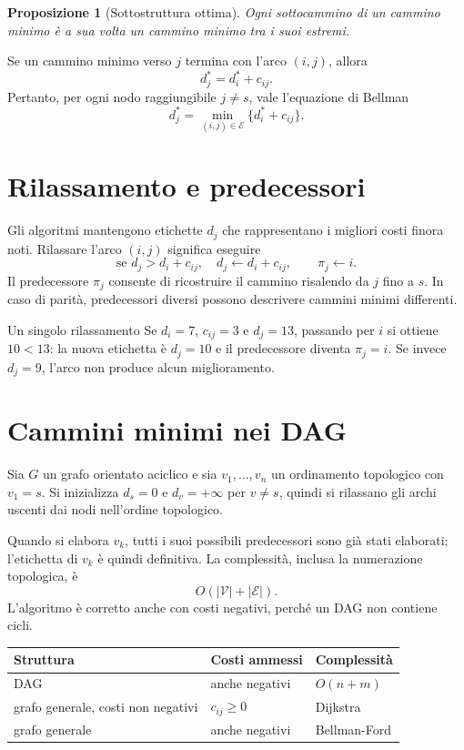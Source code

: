 \documentclass[11pt,a4paper]{article}
\newtheorem{proposition}[definition]{Proposizione}
\newcommand{\V}{\mathcal{V}}
\newcommand{\E}{\mathcal{E}}
\begin{document}
\begin{proposition}[Sottostruttura ottima]
Ogni sottocammino di un cammino minimo è a sua volta un cammino minimo tra i suoi estremi.
\end{proposition}

Se un cammino minimo verso $j$ termina con l'arco $(i,j)$, allora
\[
d_j^*=d_i^*+c_{ij}.
\]
Pertanto, per ogni nodo raggiungibile $j\neq s$, vale l'equazione di Bellman
\begin{equation}\label{eq:bellman}
d_j^*=\min_{(i,j)\in\E}\{d_i^*+c_{ij}\}.
\end{equation}

\section{Rilassamento e predecessori}

Gli algoritmi mantengono etichette $d_j$ che rappresentano i migliori costi finora noti. Rilassare l'arco $(i,j)$ significa eseguire
\[
\text{se }d_j>d_i+c_{ij},\quad
d_j\leftarrow d_i+c_{ij},\qquad \pi_j\leftarrow i.
\]
Il predecessore $\pi_j$ consente di ricostruire il cammino risalendo da $j$ fino a $s$. In caso di parità, predecessori diversi possono descrivere cammini minimi differenti.

\begin{examplebox}{Un singolo rilassamento}
Se $d_i=7$, $c_{ij}=3$ e $d_j=13$, passando per $i$ si ottiene $10<13$: la nuova etichetta è $d_j=10$ e il predecessore diventa $\pi_j=i$. Se invece $d_j=9$, l'arco non produce alcun miglioramento.
\end{examplebox}

\section{Cammini minimi nei DAG}

Sia $G$ un grafo orientato aciclico e sia $v_1,\ldots,v_n$ un ordinamento topologico con $v_1=s$. Si inizializza $d_s=0$ e $d_v=+\infty$ per $v\neq s$, quindi si rilassano gli archi uscenti dai nodi nell'ordine topologico.

Quando si elabora $v_k$, tutti i suoi possibili predecessori sono già stati elaborati; l'etichetta di $v_k$ è quindi definitiva. La complessità, inclusa la numerazione topologica, è
\[
O(|\V|+|\E|).
\]
L'algoritmo è corretto anche con costi negativi, perché un DAG non contiene cicli.

\begin{center}
\begin{tabular}{lll}
\toprule
Struttura & Costi ammessi & Complessità\\
\midrule
DAG & anche negativi & $O(n+m)$\\
grafo generale, costi non negativi & $c_{ij}\geq0$ & Dijkstra\\
grafo generale & anche negativi & Bellman-Ford\\
\bottomrule
\end{tabular}
\end{center}
\end{document}
